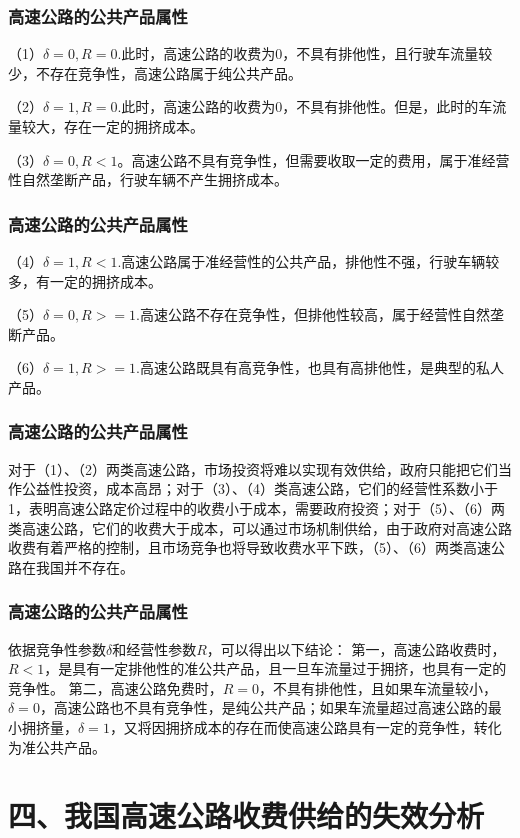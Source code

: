 \documentclass[aspectratio=169, 12pt]{beamer}
\begin{document}
\begin{frame}[plain]
    \frametitle{高速公路的公共产品属性}
    （1）$\delta =0,R=0$.此时，高速公路的收费为0，不具有排他性，且行驶车流量较少，不存在竞争性，高速公路属于纯公共产品。
    \par
    （2）$\delta =1,R=0$.此时，高速公路的收费为0，不具有排他性。但是，此时的车流量较大，存在一定的拥挤成本。
    \par
    （3）$\delta =0,R<1$。高速公路不具有竞争性，但需要收取一定的费用，属于准经营性自然垄断产品，行驶车辆不产生拥挤成本。
\end{frame}

\begin{frame}[plain]
    \frametitle{高速公路的公共产品属性}
    （4）$\delta =1,R<1$.高速公路属于准经营性的公共产品，排他性不强，行驶车辆较多，有一定的拥挤成本。
    \par
    （5）$\delta =0,R>=1$.高速公路不存在竞争性，但排他性较高，属于经营性自然垄断产品。
    \par
    （6）$\delta =1,R>=1$.高速公路既具有高竞争性，也具有高排他性，是典型的私人产品。
\end{frame}

\begin{frame}[plain]
    \frametitle{高速公路的公共产品属性}
    对于（1）、（2）两类高速公路，市场投资将难以实现有效供给，政府只能把它们当作公益性投资，成本高昂；对于（3）、（4）类高速公路，它们的经营性系数小于1，表明高速公路定价过程中的收费小于成本，需要政府投资；对于（5）、（6）两类高速公路，它们的收费大于成本，可以通过市场机制供给，由于政府对高速公路收费有着严格的控制，且市场竞争也将导致收费水平下跌，（5）、（6）两类高速公路在我国并不存在。
\end{frame}

\begin{frame}[plain]
    \frametitle{高速公路的公共产品属性}
    依据竞争性参数$\delta $和经营性参数$R$，可以得出以下结论：
    第一，高速公路收费时，$R<1$，是具有一定排他性的准公共产品，且一旦车流量过于拥挤，也具有一定的竞争性。
    第二，高速公路免费时，$R=0$，不具有排他性，且如果车流量较小，$\delta =0$，高速公路也不具有竞争性，是纯公共产品；如果车流量超过高速公路的最小拥挤量，$\delta =1$，又将因拥挤成本的存在而使高速公路具有一定的竞争性，转化为准公共产品。
\end{frame}

\section{四、我国高速公路收费供给的失效分析}
\end{document}
